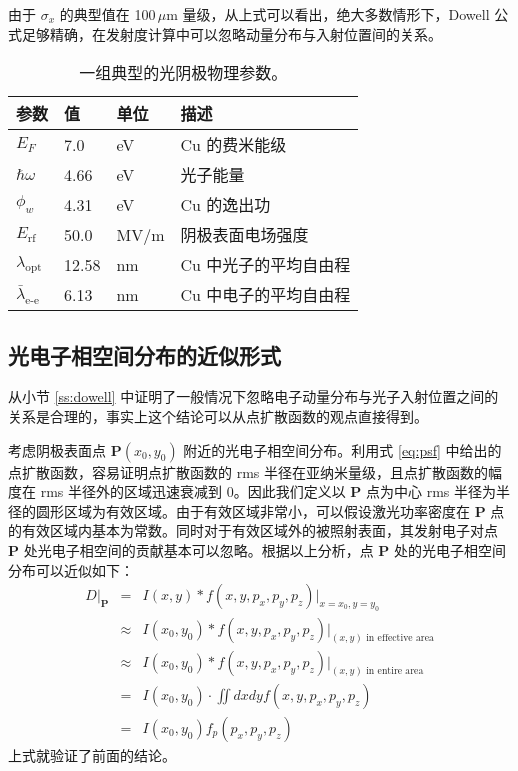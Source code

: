 由于 $\sigma_x$ 的典型值在 100\,$\mu$m 量级，从上式可以看出，绝大多数情形下，Dowell 公式足够精确，在发射度计算中可以忽略动量分布与入射位置间的关系。

\begin{table}[htbp]
\caption{\label{tab:exp}
一组典型的光阴极物理参数。}
\centering
\begin{tabular}{llll}
\toprule
参数 & 值 & 单位 & 描述 \\
\midrule
$E_F$ & 7.0 & eV & Cu 的费米能级 \\
$\hbar\omega$ & 4.66 & eV & 光子能量 \\
$\phi_w$ & 4.31 & eV & Cu 的逸出功 \\
$E_{\text{rf}}$ & 50.0 & MV/m & 阴极表面电场强度 \\
$\lambda_{\text{opt}}$ & 12.58 & nm & Cu 中光子的平均自由程 \\
$\bar{\lambda}_{\text{e-e}}$ & 6.13 & nm & Cu 中电子的平均自由程 \\
\bottomrule
\end{tabular}
\end{table}

\subsection{\label{ss:approx}光电子相空间分布的近似形式}
从小节 \ref{ss:dowell} 中证明了一般情况下忽略电子动量分布与光子入射位置之间的关系是合理的，事实上这个结论可以从点扩散函数的观点直接得到。

考虑阴极表面点 \textbf{P}$(x_0, y_0)$ 附近的光电子相空间分布。利用式 \ref{eq:psf} 中给出的点扩散函数，容易证明点扩散函数的 rms 半径在亚纳米量级，且点扩散函数的幅度在 rms 半径外的区域迅速衰减到 0。因此我们定义以 \textbf{P} 点为中心 rms 半径为半径的圆形区域为有效区域。由于有效区域非常小，可以假设激光功率密度在 \textbf{P} 点的有效区域内基本为常数。同时对于有效区域外的被照射表面，其发射电子对点 \textbf{P} 处光电子相空间的贡献基本可以忽略。根据以上分析，点 \textbf{P} 处的光电子相空间分布可以近似如下：
\begin{eqnarray}
D\big|_{\textbf{P}} &=& I(x,y)*f(x,y,p_x,p_y,p_z)\big|_{x=x_0,y=y_0}\nonumber\\
&\approx& I(x_0,y_0)*f(x,y,p_x,p_y,p_z)\big|_{(x, y)\text{ in effective area}}\nonumber\\
&\approx& I(x_0,y_0)*f(x,y,p_x,p_y,p_z)\big|_{(x, y)\text{ in entire area}}\nonumber\\
&=& I(x_0,y_0)\cdot\iint dxdyf(x,y,p_x,p_y,p_z)\nonumber\\
&=& I(x_0,y_0)f_p(p_x,p_y,p_z)
\label{eq:approx}
\end{eqnarray}
上式就验证了前面的结论。

